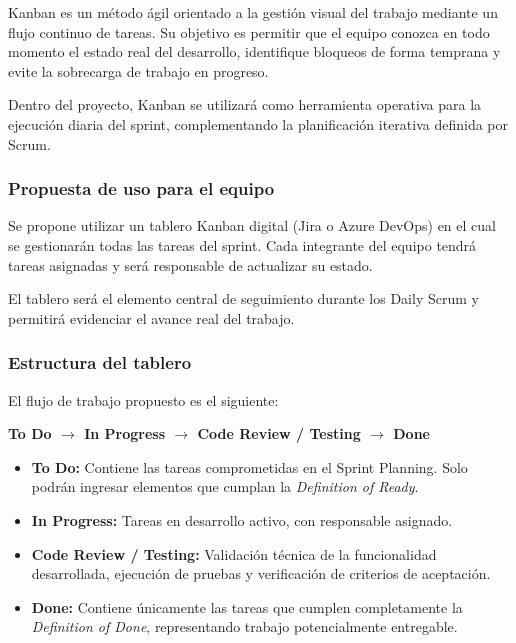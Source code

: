 \documentclass[12pt]{article}
\begin{document}
Kanban es un método ágil orientado a la gestión visual del trabajo mediante un flujo continuo de tareas. Su objetivo es permitir que el equipo conozca en todo momento el estado real del desarrollo, identifique bloqueos de forma temprana y evite la sobrecarga de trabajo en progreso.

Dentro del proyecto, Kanban se utilizará como herramienta operativa para la ejecución diaria del sprint, complementando la planificación iterativa definida por Scrum.

\subsubsection{Propuesta de uso para el equipo}

Se propone utilizar un tablero Kanban digital (Jira o Azure DevOps) en el cual se gestionarán todas las tareas del sprint. Cada integrante del equipo tendrá tareas asignadas y será responsable de actualizar su estado.

El tablero será el elemento central de seguimiento durante los Daily Scrum y permitirá evidenciar el avance real del trabajo.

\subsubsection{Estructura del tablero}

El flujo de trabajo propuesto es el siguiente:

\begin{center}
\textbf{To Do $\rightarrow$ In Progress $\rightarrow$ Code Review / Testing $\rightarrow$ Done}
\end{center}

\begin{itemize}
    \item \textbf{To Do:} Contiene las tareas comprometidas en el Sprint Planning.  
    Solo podrán ingresar elementos que cumplan la \textit{Definition of Ready}.
    
    \item \textbf{In Progress:} Tareas en desarrollo activo, con responsable asignado.
    
    \item \textbf{Code Review / Testing:} Validación técnica de la funcionalidad desarrollada, ejecución de pruebas y verificación de criterios de aceptación.
    
    \item \textbf{Done:} Contiene únicamente las tareas que cumplen completamente la \textit{Definition of Done}, representando trabajo potencialmente entregable.
\end{itemize}
\end{document}
